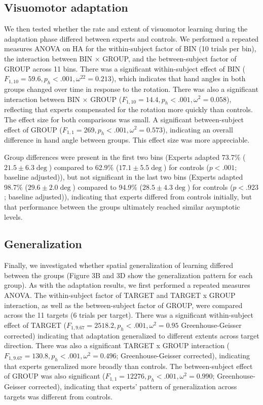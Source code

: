 \documentclass[man, 11pt, longtable, floatsintext, notab]{apa6}
\begin{document}
\subsection{Visuomotor adaptation}
We then tested whether the rate and extent of visuomotor
learning during the adaptation phase differed between
experts and controls. We performed a repeated measures ANOVA
on HA for the within-subject factor of BIN (10 trials per
bin), the interaction between BIN $\times$ GROUP, and the
between-subject factor of GROUP across 11 bins. There was a
significant within-subject effect of BIN ($F_{1,10} = 59.6,
p_h <.001, \omega^22 = 0.213$), which indicates that hand
angles in both groups changed over time in response to the
rotation. There was also a significant interaction between
BIN $\times$ GROUP ($F_{1,10} = 14.4, p_h <.001, \omega^2 =
0.058$), reflecting that experts compensated for the
rotation more quickly than controls. The effect size for
both comparisons was small. A significant between-subject
effect of GROUP ($F_{1,1} = 269, p_h <.001, \omega^2 =
0.573$), indicating an overall difference in hand angle
between groups. This effect size was more appreciable.

Group differences were present in the first two bins
(Experts adapted 73.7\% ($21.5 \pm 6.3 \deg$) compared to
62.9\% ($17.1 \pm 5.5 \deg$) for controls ($p<.001$;
baseline adjusted)), but not significant in the last two
bins (Experts adapted 98.7\% ($29.6 \pm 2.0\deg$) compared
to 94.9\% ($28.5 \pm 4.3\deg$) for controls ($p<.923$;
baseline adjusted)), indicating that experts differed from
controls initially, but that performance between the groups
ultimately reached similar asymptotic levels.

\subsection{Generalization}
Finally, we investigated whether spatial generalization of
learning differed between the groups (Figure 3B and 3D show
the generalization pattern for each group). As with the
adaptation results, we first performed a repeated measures
ANOVA. The within-subject factor of TARGET and TARGET x
GROUP interaction, as well as the between-subject factor of
GROUP, were compared across the 11 targets (6 trials per
target). There was a significant within-subject effect of
TARGET ($F_{1,9.67} = 2518.2, p_h <.001, \omega^2 = 0.95$
Greenhouse-Geisser corrected) indicating that adaptation
generalized to different extents across target direction.
There was also a significant TARGET x GROUP interaction
($F_{1,9.67} = 130.8, p_h <.001, \omega^2 = 0.496$;
Greenhouse-Geisser corrected), indicating that experts
generalized more broadly than controls. The between-subject
effect of GROUP was also significant ($F_{1,1} = 12276, p_h
<.001, \omega^2 = 0.990$; Greenhouse-Geisser corrected),
indicating that experts’ pattern of generalization across
targets was different from controls.
\end{document}
